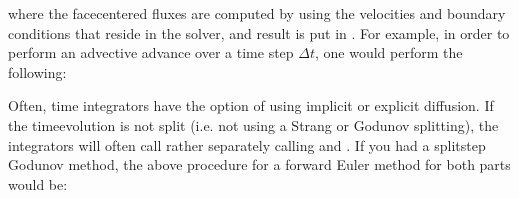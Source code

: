 \documentclass[letterpaper,10pt,english]{sphinxmanual}
\begin{document}
\sphinxAtStartPar
where the face\sphinxhyphen{}centered fluxes are computed by using the velocities and boundary conditions that reside in the solver, and result is put in .
For example, in order to perform an advective advance over a time step \(\Delta t\), one would perform the following:

\begin{sphinxVerbatim}[commandchars=\\\{\},formatcom=\scriptsize]
    

         
    
          
                 
\end{sphinxVerbatim}

\sphinxAtStartPar
Often, time integrators have the option of using implicit or explicit diffusion.
If the time\sphinxhyphen{}evolution is not split (i.e. not using a Strang or Godunov splitting), the integrators will often call  rather separately calling  and .
If you had a split\sphinxhyphen{}step Godunov method, the above procedure for a forward Euler method for both parts would be:
\end{document}
